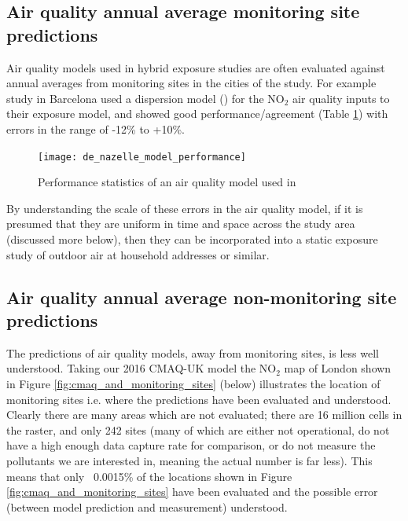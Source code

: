\subsection{Air quality annual average monitoring site predictions}
\label{air_quality_annual_average_predictions}

Air quality models used in hybrid exposure studies are often evaluated against annual averages from monitoring sites in the cities of the study. For example \cite{DeNazelle2013} study in Barcelona used a dispersion model (\cite{Lao2011}) for the NO$_{2}$ air quality inputs to their exposure model, and showed good performance/agreement (Table \ref{tab:fig:de_nazelle_model_performance}) with errors in the range of -12\% to +10\%.

\begin{figure}[H]
\centering
\texttt{[image: de\_nazelle\_model\_performance]}
\caption{Performance statistics of an air quality model used in \cite{DeNazelle2013}}
\label{tab:fig:de_nazelle_model_performance}
\end{figure}

By understanding the scale of these errors in the air quality model, if it is presumed that they are uniform in time and space across the study area (discussed more below), then they can be incorporated into a static exposure study of outdoor air at household addresses or similar.

\subsection{Air quality annual average non-monitoring site predictions}
\label{air_quality_annual_average_non_site_predictions}

The predictions of air quality models, away from monitoring sites, is less well understood. Taking our 2016 CMAQ-UK model the NO$_{2}$ map of London shown in Figure \ref{fig:cmaq_and_monitoring_sites} (below) illustrates the location of monitoring sites i.e. where the predictions have been evaluated and understood. Clearly there are many areas which are not evaluated; there are 16 million cells in the raster, and only 242 sites (many of which are either not operational, do not have a high enough data capture rate for comparison, or do not measure the pollutants we are interested in, meaning the actual number is far less). This means that only ~0.0015\% of the locations shown in Figure \ref{fig:cmaq_and_monitoring_sites} have been evaluated and the possible error (between model prediction and measurement) understood.

